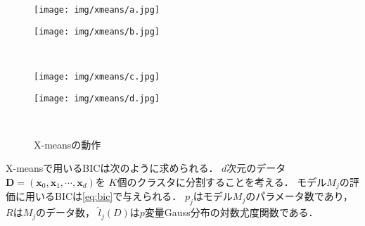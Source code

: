 \begin{figure}[htbp]
  \begin{minipage}{0.5\hsize}
    \begin{center}
      \texttt{[image: img/xmeans/a.jpg]}
    \end{center}
  \end{minipage}
  \begin{minipage}{0.5\hsize}
    \begin{center}
      \texttt{[image: img/xmeans/b.jpg]}
    \end{center}
  \end{minipage}\\
  \begin{minipage}{0.5\hsize}
    \begin{center}
      \texttt{[image: img/xmeans/c.jpg]}
    \end{center}
  \end{minipage}
  \begin{minipage}{0.5\hsize}
    \begin{center}
      \texttt{[image: img/xmeans/d.jpg]}
    \end{center}
  \end{minipage}\\
  \caption{X-meansの動作}
  \label{fig:x-means}
\end{figure}

X-meansで用いるBICは次のように求められる．
$d$次元のデータ${\bm D}=({\bm x_0}, {\bm x_1}, \cdots, {\bm x_d})$を
$K$個のクラスタに分割することを考える．
モデル$M_j$の評価に用いるBICは\eqref{eq:bic}で与えられる．
$p_j$はモデル$M_j$のパラメータ数であり，$R$は$M_j$のデータ数，
$\hat{l}_j(D)$は$p$変量Gauss分布の対数尤度関数である．

